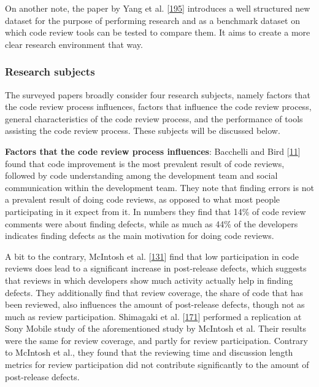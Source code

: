 \documentclass[]{book}
\begin{document}
On another note, the paper by Yang et al.
{[}\protect\hyperlink{ref-yang2016mining}{195}{]} introduces a well
structured new dataset for the purpose of performing research and as a
benchmark dataset on which code review tools can be tested to compare
them. It aims to create a more clear research environment that way.

\subsubsection{Research subjects}\label{research-subjects}

The surveyed papers broadly consider four research subjects, namely
factors that the code review process influences, factors that influence
the code review process, general characteristics of the code review
process, and the performance of tools assisting the code review process.
These subjects will be discussed below.

\textbf{Factors that the code review process influences}: Bacchelli and
Bird {[}\protect\hyperlink{ref-bacchelli2013expectations}{11}{]} found
that code improvement is the most prevalent result of code reviews,
followed by code understanding among the development team and social
communication within the development team. They note that finding errors
is not a prevalent result of doing code reviews, as opposed to what most
people participating in it expect from it. In numbers they find that
14\% of code review comments were about finding defects, while as much
as 44\% of the developers indicates finding defects as the main
motivation for doing code reviews.

A bit to the contrary, McIntosh et al.
{[}\protect\hyperlink{ref-mcintosh2014impact}{131}{]} find that low
participation in code reviews does lead to a significant increase in
post-release defects, which suggests that reviews in which developers
show much activity actually help in finding defects. They additionally
find that review coverage, the share of code that has been reviewed,
also influences the amount of post-release defects, though not as much
as review participation. Shimagaki et al.
{[}\protect\hyperlink{ref-shimagaki2016study}{171}{]} performed a
replication at Sony Mobile study of the aforementioned study by McIntosh
et al. Their results were the same for review coverage, and partly for
review participation. Contrary to McIntosh et al., they found that the
reviewing time and discussion length metrics for review participation
did not contribute significantly to the amount of post-release defects.
\end{document}
